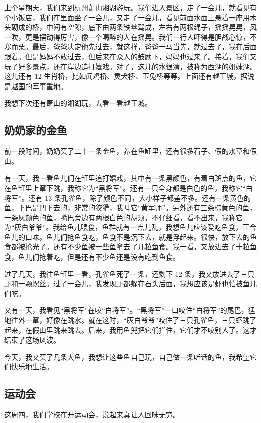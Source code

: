 \documentclass[UTF8,a4paper,titlepage,twoside,10.5pt]{article}
\begin{document}
上个星期天，我们来到杭州萧山湘湖游玩。我们进入景区，走了一会儿，就看见有个小饭店，我们在里面坐了一会儿，又走了一会儿，看见前面水面上悬着一座用木头砌成的桥，中间有空隙，底下由两条铁丝驾成，左右有两根绳子，摇摇晃晃，风一吹，更是摆动得厉害，像一个喝醉的人在摇晃。我们一行人吓得是胆战心惊，不寒而栗。最后，爸爸决定他先过去，就这样，爸爸一马当先，就过去了，我在后面跟着。但是妈妈不敢过去，但后来在众人的鼓励下，妈妈也过来了。接着，我们又玩了好多景点，还在岸边追打嬉戏。对了，这儿的水很清，被称为西湖的姐妹湖。这儿还有 12 生肖桥，比如闻鸡桥、灵犬桥、玉兔桥等等。上面还有越王城，据说是越国的军事重地。

我想下次还有萧山的湘湖玩，去看一看越王城。

\subsection{奶奶家的金鱼}
\label{sec:orgc0012b8}

前一段时间，奶奶买了二十一条金鱼，养在鱼缸里，还有很多石子、假的水草和假山。

有一天，我一看鱼儿们在缸里追打嬉戏，其中有一条黑颜色，有着白斑点的鱼，它在鱼缸里上窜下跳，我称它为“黑将军”。还有一只全身都是白色的鱼，我称它“白将军”。还有 13 条孔雀鱼，除了颜色不同，大小样子都差不多。还有一条黄色的鱼，下巴是凹下去的，非常的狡猾，我叫它“黄军师”。另外还有三条棕黄色的鱼，一条灰颜色的鱼，嘴巴旁边有两根白色的胡须，不仔细看，看不出来，我称它为“灰白爷爷”。我给鱼儿喂食，鱼群就有一点儿乱，我想鱼儿应该爱吃鱼食，正合鱼儿的口味。鱼儿们抢鱼食吃，鱼食不是沉下去，就是浮起来。很快，放下去的鱼食都被抢光了。还有不少鱼被一些鱼拿去了几粒鱼食。我一看，又放进去了十粒鱼食，鱼儿们抢着吃，但是还有不少鱼还是没有吃到鱼食。

过了几天，我往鱼缸里一看，孔雀鱼死了一条，还剩下 12 条，我又放进去了三只虾和一颗螺丝。过了一会儿，我发现虾都躲在石头后面，我想应该是虾也怕被鱼儿们吃。

又有一天，我看见“黑将军”在咬“白将军”。“黑将军”一口咬住“白将军”的尾巴，猛地往外一窜，好像在跳水。就在这时，“灰白爷爷”咬住了三只孔雀鱼，三只虾跳了起来，在假山里跳来跳去。后来，我用鱼兜把它们拦住，它们才不咬别人了。这才结束了这场风波。

今天，我又买了几条大鱼，我想让这些鱼自己玩，自己做一条听话的鱼，我希望它们快乐地生活。

\subsection{运动会}
\label{sec:org00fba1d}

这周四，我们学校在开运动会，说起来真让人回味无穷。
\end{document}

